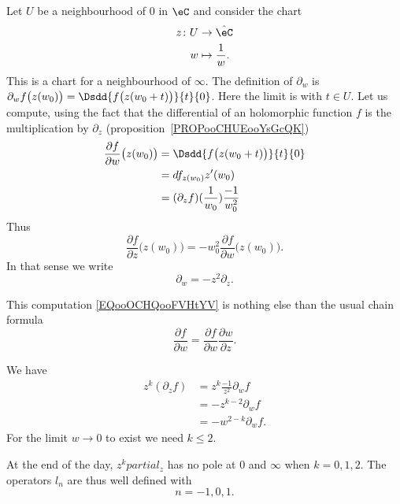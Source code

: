 Let \( U\) be a neighbourhood of \( 0\) in \( \eC\) and consider the chart
\begin{equation}
	\begin{aligned}
		z\colon U & \to \hat \eC           \\
		w         & \mapsto \frac{1}{ w }.
	\end{aligned}
\end{equation}
This is a chart for a neighbourhood of \( \infty\). The definition of \( \partial_w\) is \( \partial_wf\big( z(w_0) \big)=\Dsdd{ f\big( z(w_0+t) \big) }{t}{0}  \). Here the limit is with \( t\in U\). Let us compute, using the fact that the differential of an holomorphic function \( f\) is the multiplication by \( \partial_z\) (proposition~\ref{PROPooCHUEooYsGcQK})
\begin{subequations}        \label{EQooOCHQooFVHtYV}
	\begin{align}
		\frac{ \partial f }{ \partial w }\big( z(w_0) \big) & =\Dsdd{ f\big( z(w_0+t) \big) }{t}{0}               \\
		                                                    & =df_{z(w_0)}z'(w_0)                                 \\
		                                                    & =(\partial_zf)(\frac{1}{ w_0 })\frac{ -1 }{ w_0^2 }
	\end{align}
\end{subequations}
Thus
\begin{equation}
	\frac{ \partial f }{ \partial z }\big( z(w_0) \big)=-w_0^2\frac{ \partial f }{ \partial w }\big( z(w_0) \big).
\end{equation}
In that sense we write
\begin{equation}
	\partial_w=-z^2\partial_z.
\end{equation}

\begin{remark}
	This computation \eqref{EQooOCHQooFVHtYV} is nothing else than the usual chain formula
	\begin{equation}
		\frac{ \partial f }{ \partial w }=\frac{ \partial f }{ \partial w }\frac{ \partial w }{ \partial z }.
	\end{equation}
\end{remark}

We have
\begin{subequations}
	\begin{align}
		z^k(\partial_zf) & =z^k\frac{-1}{ z^2 }\partial_wf \\
		                 & =-z^{k-2}\partial_wf            \\
		                 & =-w^{2-k}\partial_wf.
	\end{align}
\end{subequations}
For the limit \( w\to 0\) to exist we need \( k\leq 2\).

At the end of the day, \( z^kpartial_z\) has no pole at \( 0\) and \( \infty\) when \( k=0,1,2\). The operators \( l_n\) are thus well defined with
\begin{equation}
	n=-1,0,1.
\end{equation}

